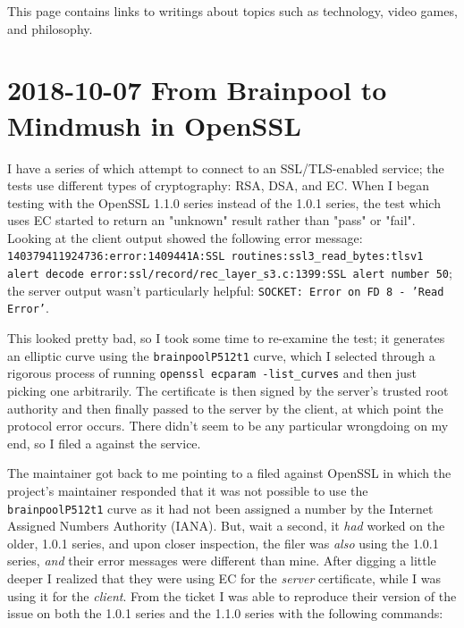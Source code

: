 \documentclass{article}
\begin{document}
This page contains links to writings about topics such as technology, video games, and philosophy.

\tableofchildlinks*



\section{2018-10-07 From Brainpool to Mindmush in OpenSSL}
I have a series of  which attempt to connect to an SSL/TLS-enabled service; the tests use different types of cryptography: RSA, DSA, and EC.  When I began testing with the OpenSSL 1.1.0 series instead of the 1.0.1 series, the test which uses EC started to return an "unknown" result rather than "pass" or "fail".  Looking at the client output showed the following error message: \texttt{140379411924736:error:1409441A:SSL routines:ssl3_read_bytes:tlsv1 alert decode error:ssl/record/rec_layer_s3.c:1399:SSL alert number 50}; the server output wasn't particularly helpful: \texttt{SOCKET: Error on FD 8 - 'Read Error'}.

This looked pretty bad, so I took some time to re-examine the test; it generates an elliptic curve using the \texttt{brainpoolP512t1} curve, which I selected through a rigorous process of running \texttt{openssl ecparam -list_curves} and then just picking one arbitrarily.  The certificate is then signed by the server's trusted root authority and then finally passed to the server by the client, at which point the protocol error occurs.  There didn't seem to be any particular wrongdoing on my end, so I filed a  against the service.

The maintainer got back to me pointing to a  filed against OpenSSL in which the project's maintainer responded that it was not possible to use the \texttt{brainpoolP512t1} curve as it had not been assigned a number by the Internet Assigned Numbers Authority (IANA).  But, wait a second, it \emph{had} worked on the older, 1.0.1 series, and upon closer inspection, the filer was \emph{also} using the 1.0.1 series, \emph{and} their error messages were different than mine.  After digging a little deeper I realized that they were using EC for the \emph{server} certificate, while I was using it for the \emph{client}.  From the ticket I was able to reproduce their version of the issue on both the 1.0.1 series and the 1.1.0 series with the following commands:
\end{document}
